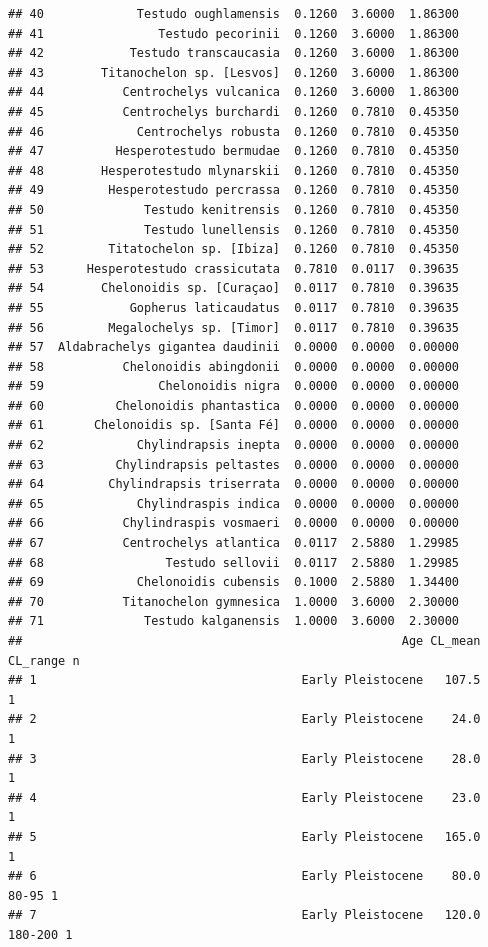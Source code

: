 \documentclass[]{article}
\begin{document}
\begin{verbatim}
## 40             Testudo oughlamensis  0.1260  3.6000  1.86300
## 41                Testudo pecorinii  0.1260  3.6000  1.86300
## 42            Testudo transcaucasia  0.1260  3.6000  1.86300
## 43        Titanochelon sp. [Lesvos]  0.1260  3.6000  1.86300
## 44           Centrochelys vulcanica  0.1260  3.6000  1.86300
## 45           Centrochelys burchardi  0.1260  0.7810  0.45350
## 46             Centrochelys robusta  0.1260  0.7810  0.45350
## 47          Hesperotestudo bermudae  0.1260  0.7810  0.45350
## 48        Hesperotestudo mlynarskii  0.1260  0.7810  0.45350
## 49         Hesperotestudo percrassa  0.1260  0.7810  0.45350
## 50              Testudo kenitrensis  0.1260  0.7810  0.45350
## 51              Testudo lunellensis  0.1260  0.7810  0.45350
## 52         Titatochelon sp. [Ibiza]  0.1260  0.7810  0.45350
## 53      Hesperotestudo crassicutata  0.7810  0.0117  0.39635
## 54        Chelonoidis sp. [Curaçao]  0.0117  0.7810  0.39635
## 55            Gopherus laticaudatus  0.0117  0.7810  0.39635
## 56         Megalochelys sp. [Timor]  0.0117  0.7810  0.39635
## 57  Aldabrachelys gigantea daudinii  0.0000  0.0000  0.00000
## 58           Chelonoidis abingdonii  0.0000  0.0000  0.00000
## 59                Chelonoidis nigra  0.0000  0.0000  0.00000
## 60          Chelonoidis phantastica  0.0000  0.0000  0.00000
## 61       Chelonoidis sp. [Santa Fé]  0.0000  0.0000  0.00000
## 62             Chylindrapsis inepta  0.0000  0.0000  0.00000
## 63          Chylindrapsis peltastes  0.0000  0.0000  0.00000
## 64         Chylindrapsis triserrata  0.0000  0.0000  0.00000
## 65             Chylindraspis indica  0.0000  0.0000  0.00000
## 66           Chylindraspis vosmaeri  0.0000  0.0000  0.00000
## 67           Centrochelys atlantica  0.0117  2.5880  1.29985
## 68                 Testudo sellovii  0.0117  2.5880  1.29985
## 69             Chelonoidis cubensis  0.1000  2.5880  1.34400
## 70           Titanochelon gymnesica  1.0000  3.6000  2.30000
## 71              Testudo kalganensis  1.0000  3.6000  2.30000
##                                                     Age CL_mean CL_range n
## 1                                     Early Pleistocene   107.5          1
## 2                                     Early Pleistocene    24.0          1
## 3                                     Early Pleistocene    28.0          1
## 4                                     Early Pleistocene    23.0          1
## 5                                     Early Pleistocene   165.0          1
## 6                                     Early Pleistocene    80.0    80-95 1
## 7                                     Early Pleistocene   120.0  180-200 1

\end{verbatim}
\end{document}
